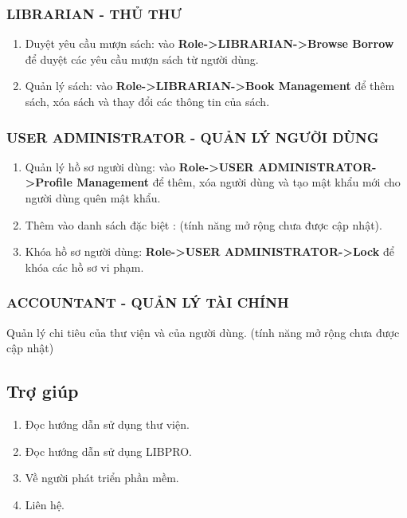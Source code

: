 \documentclass[12pt,a4paper]{report}
\begin{document}
            \subsubsection{LIBRARIAN - THỦ THƯ}
                \begin{enumerate}
                    \item Duyệt yêu cầu mượn sách: vào \textbf{Role->LIBRARIAN->Browse Borrow} để duyệt các yêu cầu mượn sách từ người dùng.
                    \item Quản lý sách: vào \textbf{Role->LIBRARIAN->Book Management} để thêm sách, xóa sách và thay đổi các thông tin của sách.
                \end{enumerate}
            \subsubsection{USER ADMINISTRATOR - QUẢN LÝ NGƯỜI DÙNG}
                \begin{enumerate}
                    \item Quản lý hồ sơ người dùng: vào \textbf{Role->USER ADMINISTRATOR->Profile Management} để thêm, xóa người dùng và tạo mật khẩu mới cho người dùng quên mật khẩu.
                    \item Thêm vào danh sách đặc biệt : (tính năng mở rộng chưa được cập nhật).
                    \item Khóa hồ sơ người dùng: \textbf{Role->USER ADMINISTRATOR->Lock} để khóa các hồ sơ vi phạm.
                \end{enumerate}
            \subsubsection{ACCOUNTANT - QUẢN LÝ TÀI CHÍNH}
            Quản lý chi tiêu của thư viện và của người dùng. (tính năng mở rộng chưa được cập nhật)
        \subsection{Trợ giúp}
            \begin{enumerate}
                \item Đọc hướng dẫn sử dụng thư viện.
                \item Đọc hướng dẫn sử dụng LIBPRO.
                \item Về người phát triển phần mềm.
                \item Liên hệ.
            \end{enumerate}
\end{document}
